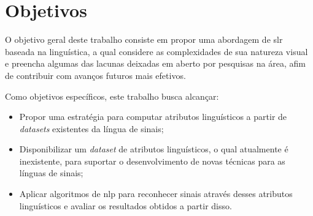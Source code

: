 \section{Objetivos}
\label{sec:introducao-objetivos}

O objetivo geral deste trabalho consiste em propor uma abordagem de \acrlong{slr} baseada na linguística, a qual considere as complexidades de sua natureza visual e preencha algumas das lacunas deixadas em aberto por pesquisas na área, afim de contribuir com avanços futuros mais efetivos.



Como objetivos específicos, este trabalho busca alcançar:


\begin{itemize}
    \item Propor uma estratégia para computar atributos linguísticos a partir de \textit{datasets} existentes da língua de sinais;
    \item Disponibilizar um \textit{dataset} de atributos linguísticos, o qual atualmente é inexistente, para suportar o desenvolvimento de novas técnicas para as línguas de sinais;
    \item Aplicar algoritmos de \acrlong{nlp} para reconhecer sinais através desses atributos linguísticos e avaliar os resultados obtidos a partir disso.
\end{itemize}


